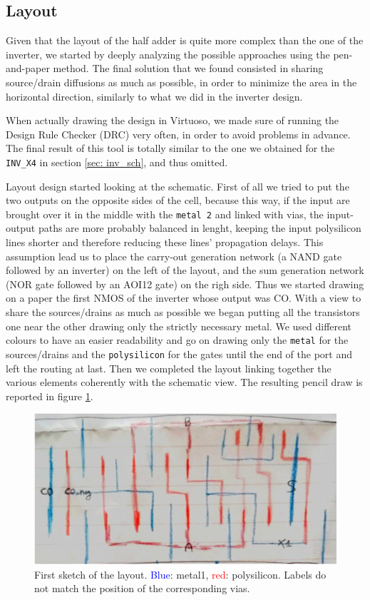 \documentclass[a4paper]{article}
\newcommand{\inv}{\texttt{INV\_X4}\xspace}
\begin{document}
\subsection{Layout}
Given that the layout of the half adder is quite more complex than the one of the inverter, we started by deeply analyzing the possible approaches using the pen-and-paper method. The final solution that we found consisted in sharing source/drain diffusions as much as possible, in order to minimize the area in the horizontal direction, similarly to what we did in the inverter design.

When actually drawing the design in Virtuoso, we made sure of running the Design Rule Checker (DRC) very often, in order to avoid problems in advance. The final result of this tool is totally similar to the one we obtained for the \inv in section \ref{sec: inv_sch}, and thus omitted.

Layout design started looking at the schematic. First of all we tried to put the two outputs on the opposite sides of the cell, because this way, if the input are brought over it in the middle with the \texttt{metal 2} and linked with vias, the input-output paths are more probably balanced in lenght, keeping the input polysilicon lines shorter and therefore reducing these lines' propagation delays. This assumption lead us to place the carry-out generation network (a NAND gate followed by an inverter) on the left of the layout, and the sum generation network (NOR gate followed by an AOI12 gate) on the righ side.
Thus we started drawing on a paper the first NMOS of the inverter whose output was CO. With a view to share the sources/drains as much as possible we began putting all the transistors one near the other drawing only the strictly necessary metal.
We used different colours to have an easier readability and go on drawing only the \texttt{metal} for the sources/drains and the \texttt{polysilicon} for the gates until the end of the port and left the routing at last. Then we completed the layout linking together the various elements coherently with the schematic view. The resulting pencil draw is reported in figure \ref{fig: lay_drw}.

\begin{figure}[H]
      \centering
      \includegraphics[width=0.8\linewidth]{./Images/HA/layout_drw.png}
	  \caption{First sketch of the layout. \textcolor{blue}{Blue}: metal1, \textcolor{red}{red}: polysilicon. Labels do not match the position of the corresponding vias.}
	  \label{fig: lay_drw}
\end{figure}
\end{document}

